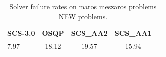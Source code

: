 \begin{table}
\centering
\caption{Solver failure rates on maros meszaros problems NEW problems.}
\label{t-maros meszaros problems NEW-failure}
\begin{tabular}{lcccc}
\toprule
 SCS-3.0 &  OSQP &  SCS\_AA2 &  SCS\_AA1 \\
\midrule
    7.97 & 18.12 &    19.57 &    15.94 \\
\bottomrule
\end{tabular}
\end{table}
